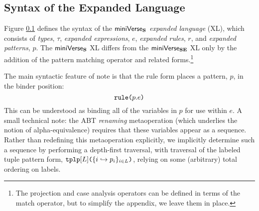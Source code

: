 {{{{\subsection{Syntax of the Expanded Language}\label{sec:UP-expanded-terms}\label{sec:inner-core-syntax-UP}
Figure \ref{sec:UP-expanded-terms} defines the syntax of the $\mathsf{miniVerse}_\textbf{S}$ \emph{expanded language} (XL), which consists of \emph{types}, $\tau$, \emph{expanded expressions}, $e$, \emph{expanded rules}, $r$, and \emph{expanded patterns}, $p$. The $\mathsf{miniVerse}_\textbf{S}$ XL differs from the $\mathsf{miniVerse}_\textbf{SE}$ XL only by the addition of the pattern matching operator and related forms.\footnote{The projection and case analysis operators can be defined in terms of the match operator, but to simplify the appendix, we leave them in place.} %


The main syntactic feature of note is that the rule form places a pattern, $p$, in the binder position:
\[
\texttt{rule}\texttt{(}p.e\texttt{)}
\]
This can be understood as binding all of the variables in $p$ for use within $e$. A small technical note: the ABT \emph{renaming} metaoperation (which underlies the notion of alpha-equivalence) requires that these variables appear as a sequence. Rather than redefining this metaoperation explicitly, we implicitly determine such a sequence by performing a depth-first traversal, with traversal of the labeled tuple pattern form, $\texttt{tplp}[L]\texttt{(}\{i \hookrightarrow p_{i}\}_{i \in L}\texttt{)}$, relying on some (arbitrary) total ordering on labels.

}}}}
